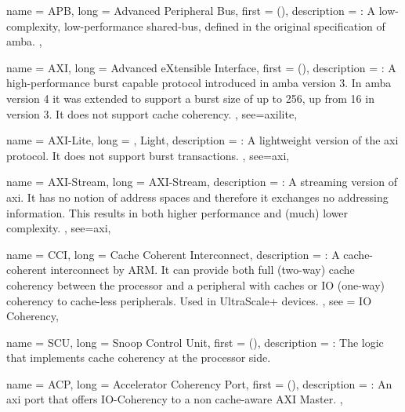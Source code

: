 {
	name = {APB},
	long = {Advanced Peripheral Bus},
	first = { ()},
	description = {\emph{}:
		A low-complexity, low-performance shared-bus, defined in the original
		specification of \gls{amba}.
	},
}


{
	name = {AXI},
	long = {Advanced eXtensible Interface},
	first = { ()},
	description = {\emph{}:
		A high-performance \gls{burst} capable protocol introduced in \gls{amba} version 3.
		In \gls{amba} version 4 it was extended to support a \gls{burst} size of up to 256,
		up from 16 in version 3. It does not support cache coherency.
	},
	see={axilite},
}


{
	name = {AXI-Lite},
	long = {, Light},
	description = {\emph{}:
		A lightweight version of the \gls{axi} protocol. 
		It does not support \gls{burst} transactions.
	},
	see={axi},
}

{
	name = {AXI-Stream},
	long = {AXI-Stream},
	description = {\emph{}:
		A streaming version of \gls{axi}. It has no notion of address spaces
		and therefore it exchanges no addressing information. 
		This results in both higher performance and (much) lower complexity.
	},
	see={axi},
}



{
	name = {CCI},
	long = {Cache Coherent Interconnect},
	description = {\emph{}:
		A cache-coherent interconnect by ARM. 
		It can provide both full (two-way) cache coherency between the processor and
		a peripheral with caches or IO (one-way) coherency to cache-less
		peripherals. Used in UltraScale+ devices.
	},
	see = {IO Coherency},
}



{
	name = {SCU},
	long = {Snoop Control Unit},
	first = { ()},
	description = {\emph{}:
		The logic that implements cache coherency at the processor side.
	}
}

{
	name = {ACP},
	long = {Accelerator Coherency Port},
	first = { ()},
	description = {\emph{}:
		An \gls{axi} port that offers IO-Coherency to a non cache-aware AXI Master.
	},
}


